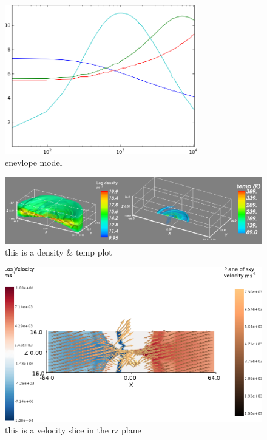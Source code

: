 \documentclass[useAMS,usenatbib]{mn2e}
\begin{document}
\begin{figure}
 \includegraphics[width=84mm]{Figures/model/L1544model_used.png}

 \caption{enevlope model}
\end{figure}

\begin{figure}
 \includegraphics[width=168mm]{Figures/model/rhoT.png}

 \caption{this is a density \& temp plot}
\end{figure}

\begin{figure}
 \includegraphics[width=168mm]{Figures/model/velocity_rzSlice_thetaColourScale2.png}

 \caption{this is a velocity slice in the rz plane}
\end{figure}
\end{document}
